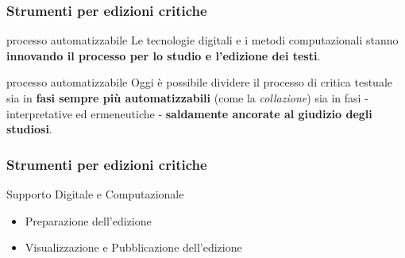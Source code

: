 %
%
%
%
%
%
%
%
%




\begin{frame}
	\frametitle{Strumenti per edizioni critiche}
	\addtocounter{nframe}{1}
    \begin{block}{processo automatizzabile}
       Le tecnologie digitali e i metodi computazionali stanno \textbf{innovando il processo per lo studio e l'edizione dei testi}.
    \end{block}
    \begin{block}{processo automatizzabile}
        Oggi è possibile dividere il processo di critica testuale sia in \textbf{fasi sempre più automatizzabili} (come la \textit{collazione}) sia in fasi  - interpretative ed ermeneutiche - \textbf{saldamente ancorate al giudizio degli studiosi}.
     \end{block}
	
\end{frame}

\begin{frame}
	\frametitle{Strumenti per edizioni critiche}
	\addtocounter{nframe}{1}
   
    \begin{block}{Supporto Digitale e Computazionale}
        \begin{itemize}
            \item Preparazione dell'edizione
            \item Visualizzazione e Pubblicazione dell'edizione
        \end{itemize}
    \end{block}
	
\end{frame}

